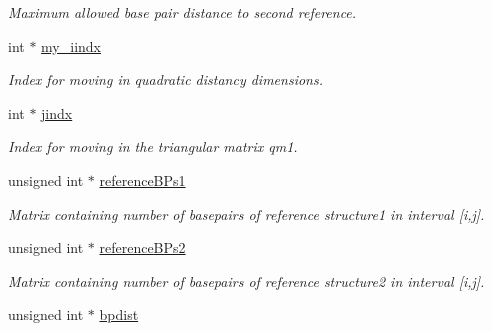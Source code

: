 \begin{DoxyCompactItemize}
\begin{DoxyCompactList}\small\item\em Maximum allowed base pair distance to second reference. \end{DoxyCompactList}\item 
\hypertarget{structTwoDpfold__vars_ac2d3e6abf0cb0e1df363904fc938076e}{int $\ast$ \hyperlink{structTwoDpfold__vars_ac2d3e6abf0cb0e1df363904fc938076e}{my\-\_\-iindx}}\label{structTwoDpfold__vars_ac2d3e6abf0cb0e1df363904fc938076e}

\begin{DoxyCompactList}\small\item\em Index for moving in quadratic distancy dimensions. \end{DoxyCompactList}\item 
\hypertarget{structTwoDpfold__vars_a0699e194a797532c91b284ab10272384}{int $\ast$ \hyperlink{structTwoDpfold__vars_a0699e194a797532c91b284ab10272384}{jindx}}\label{structTwoDpfold__vars_a0699e194a797532c91b284ab10272384}

\begin{DoxyCompactList}\small\item\em Index for moving in the triangular matrix qm1. \end{DoxyCompactList}\item 
\hypertarget{structTwoDpfold__vars_aea15706d27b6b0fc19f5773919f43a8a}{unsigned int $\ast$ \hyperlink{structTwoDpfold__vars_aea15706d27b6b0fc19f5773919f43a8a}{reference\-B\-Ps1}}\label{structTwoDpfold__vars_aea15706d27b6b0fc19f5773919f43a8a}

\begin{DoxyCompactList}\small\item\em Matrix containing number of basepairs of reference structure1 in interval \mbox{[}i,j\mbox{]}. \end{DoxyCompactList}\item 
\hypertarget{structTwoDpfold__vars_a1221396d712bf76b7f35297f2ab35a9f}{unsigned int $\ast$ \hyperlink{structTwoDpfold__vars_a1221396d712bf76b7f35297f2ab35a9f}{reference\-B\-Ps2}}\label{structTwoDpfold__vars_a1221396d712bf76b7f35297f2ab35a9f}

\begin{DoxyCompactList}\small\item\em Matrix containing number of basepairs of reference structure2 in interval \mbox{[}i,j\mbox{]}. \end{DoxyCompactList}\item 
\hypertarget{structTwoDpfold__vars_accef8eaa05fa57ca33aa22cbc7b7aaff}{unsigned int $\ast$ \hyperlink{structTwoDpfold__vars_accef8eaa05fa57ca33aa22cbc7b7aaff}{bpdist}}\label{structTwoDpfold__vars_accef8eaa05fa57ca33aa22cbc7b7aaff}


\end{DoxyCompactItemize}
